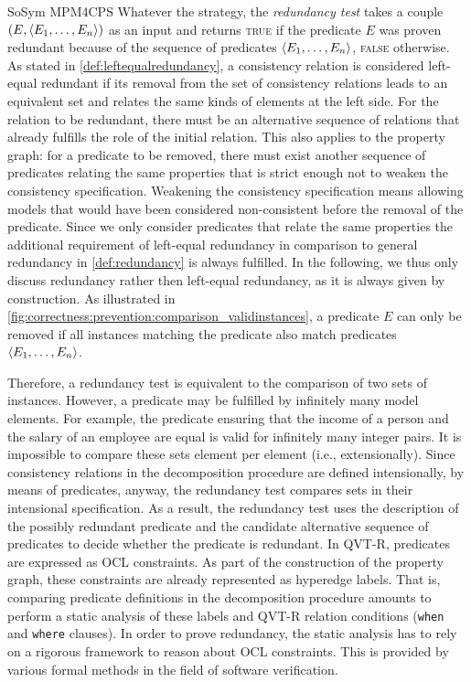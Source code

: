 \begin{copiedFrom}{SoSym MPM4CPS}
Whatever the strategy, the \textit{redundancy test} takes a couple $(E, \langle E_1, \dots, E_n \rangle)$ as an input and returns \textsc{true} if the predicate $E$ was proven redundant because of the sequence of predicates $\langle E_1, \dots, E_n \rangle$, \textsc{false} otherwise. As stated in \autoref{def:leftequalredundancy}, a consistency relation is considered left-equal redundant if its removal from the set of consistency relations leads to an equivalent set and relates the same kinds of elements at the left side. For the relation to be redundant, there must be an alternative sequence of relations that already fulfills the role of the initial relation. This also applies to the property graph: for a predicate to be removed, there must exist another sequence of predicates relating the same properties that is strict enough not to weaken the consistency specification. Weakening the consistency specification means allowing models that would have been considered non-consistent before the removal of the predicate. 
Since we only consider predicates that relate the same properties the additional requirement of left-equal redundancy in comparison to general redundancy in \autoref{def:redundancy} is always fulfilled. In the following, we thus only discuss redundancy rather then left-equal redundancy, as it is always given by construction.
As illustrated in \autoref{fig:correctness:prevention:comparison_validinstances}, a predicate $E$ can only be removed if all instances matching the predicate also match predicates $\langle E_1, \dots, E_n \rangle$.

Therefore, a redundancy test is equivalent to the comparison of two sets of instances. However, a predicate may be fulfilled by infinitely many model elements. For example, the predicate ensuring that the income of a person and the salary of an employee are equal is valid for infinitely many integer pairs. It is impossible to compare these sets element per element (i.e., extensionally). 
Since consistency relations in the decomposition procedure are defined intensionally, by means of predicates, anyway, the redundancy test compares sets in their intensional specification.
As a result, the redundancy test uses the description of the possibly redundant predicate and the candidate alternative sequence of predicates to decide whether the predicate is redundant.  
In QVT-R, predicates are expressed as OCL constraints. As part of the construction of the property graph, these constraints are already represented as hyperedge labels. That is, comparing predicate definitions in the decomposition procedure amounts to perform a static analysis of these labels and QVT-R relation conditions (\texttt{when} and \texttt{where} clauses). In order to prove redundancy, the static analysis has to rely on a rigorous framework to reason about OCL constraints. This is provided by various formal methods in the field of software verification.


\end{copiedFrom}
